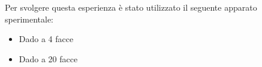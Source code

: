 Per svolgere questa esperienza è stato utilizzato il seguente apparato sperimentale:
\begin{itemize}
	\item Dado a 4 facce
	\item Dado a 20 facce
\end{itemize}

